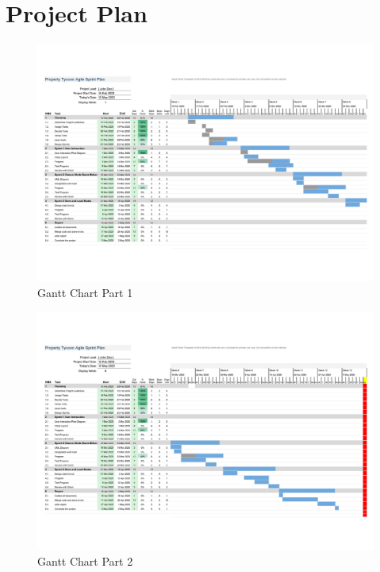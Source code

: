 
\section{Project Plan}

\begin{figure}[ht]
    \centering
    \includegraphics[width=\textwidth]{docs/Report/PTP1.jpg}
    \caption{Gantt Chart Part 1}
    \label{fig:Ganntp1}
\end{figure}

\begin{figure}[htb]
    \centering
    \includegraphics[width=\textwidth]{docs/Report/PTP2.jpg}
    \caption{Gantt Chart Part 2}
    \label{fig:Ganntp2}
\end{figure}